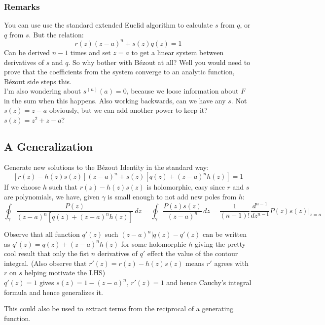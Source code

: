 \subsubsection{Remarks}
You can use use the standard extended Euclid algorithm to calculate $s$ from $q$, or $q$ from $s$.
But the relation:
\[r(z)(z-a)^n+s(z)q(z)=1\]
Can be derived $n-1$ times and set $z=a$ to get a linear system between derivatives of $s$ and $q$.
So why bother with Bézout at all?
Well you would need to prove that the coefficients from the system converge to an analytic function,
Bézout side steps this.
\\

I'm also wondering about $s^{(n)}(a)=0$,
because we loose information about $F$ in the sum when this happens.
Also working backwards, can we have any $s$.
Not $s(z) = z-a$ obviously, but we can add another power to keep it? 
$s(z) = z^2+z-a$?

\subsection{A Generalization}
Generate new solutions to the Bézout Identity in the standard way:
\[[r(z)-h(z)s(z)](z-a)^n+s(z)[q(z)+(z-a)^nh(z)]=1\]
If we choose $h$ such that $r(z)-h(z)s(z)$ is holomorphic,
easy since $r$ and $s$ are polynomials, we have, given $\gamma$ is small enough to not add new poles from $h$:
\[\oint_\gamma\frac{P(z)}{(z-a)^n[q(z)+(z-a)^nh(z)]}\,dz = \oint_\gamma \frac{P(z)s(z)}{(z-a)^n}\,dz= \frac{1}{(n-1)!}\frac{d^{n-1}}{dz^{n-1}}P(z)s(z)\bigg|_{z=a}\]

Observe that all function $q'(z)$ such $(z-a)^n | q(z)-q'(z)$ can be written as $q'(z) = q(z)+(z-a)^nh(z)$ for some holomorphic $h$ giving the pretty cool result that only the fist $n$ derivatives of $q'$ effect the value of the contour integral.
(Also observe that $r'(z) = r(z)-h(z)s(z)$ means $r'$ agrees  with $r$ on $s$ helping motivate the LHS)
\\

$q'(z)=1$ gives $s(z)=1-(z-a)^n,\,r'(z)=1$ and hence Cauchy's integral formula and hence generalizes it.

This could also  be used to extract terms from the reciprocal of a generating function.
